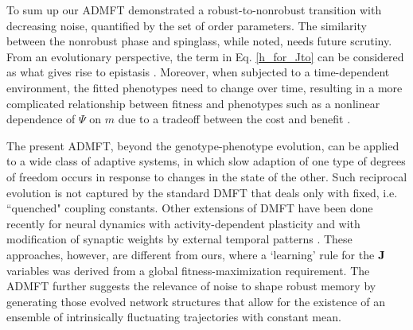 \documentclass[%
 reprint,
superscriptaddress,
 amsmath,amssymb,
 prl,
]{revtex4-2}
\newcommand{\re}{\color{red}} %
\begin{document}
 To sum up our ADMFT  demonstrated a robust-to-nonrobust transition with  decreasing noise, quantified by the set of order parameters.  The similarity between the nonrobust phase and spinglass, while noted,  needs future scrutiny. 
From an evolutionary perspective, the term in Eq. \eqref{h_for_Jto} can be considered as what gives rise to epistasis \cite{Zhou2022}. %
 Moreover,  when subjected to  a time-dependent environment,  the fitted phenotypes  need to change over time, resulting in a more complicated %
relationship between  fitness and phenotypes  such as a  nonlinear dependence of $\Psi$ on $m$ due to a tradeoff between the cost and benefit \cite{Dekel2005}. 

 The  present ADMFT, beyond the genotype-phenotype evolution, can be applied to a wide class of adaptive systems, in which slow adaption of one type of degrees of freedom occurs in response to changes in the state of the other. Such reciprocal evolution is not captured by the standard DMFT that deals only with  fixed, i.e. ``quenched" coupling constants. Other extensions of DMFT  have been done recently  for neural dynamics with activity-dependent plasticity \cite{clark2023theory} and with  modification of synaptic
weights by external temporal patterns  \cite{Pereira-Obilinovic}. These approaches, however, are different from ours, where  a `learning' rule for the $\bold{J}$ variables  was derived from  a global fitness-maximization requirement. 
The ADMFT further suggests the relevance of noise to shape robust memory by generating those evolved network structures that allow for the existence of an ensemble of intrinsically fluctuating  trajectories with constant mean. %
 
\end{document}
